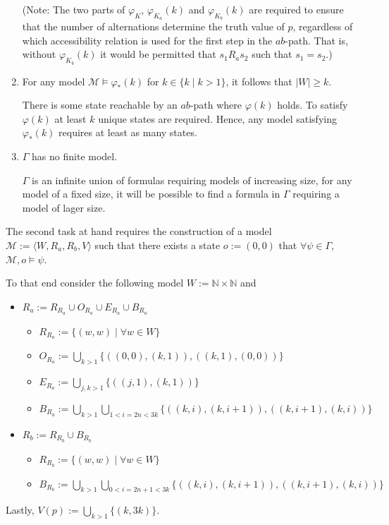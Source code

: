 \documentclass[11pt,a4paper]{article}
\begin{document}
\begin{enumerate}
(Note: The two parts of $\varphi_K$, $\varphi_{K_a}(k)$ and $ \varphi_{K_b}(k)$ are required to ensure that the number of alternations determine the truth value of $p$, regardless of which accessibility relation is used for the first step in the $ab$-path. That is, without $ \varphi_{K_b}(k)$ it would be permitted that $s_1R_as_2$ such that $s_1=s_2$.) 

\item For any model $\mathcal{M} \models \varphi_*(k)$ for $k \in \{k \mid k>1\}$, it follows that $|W|\geq k$.

There is some state reachable by an $ab$-path where $\varphi(k)$ holds. To satisfy $\varphi(k)$ at least $k$ unique states are required. Hence, any model satisfying $\varphi_*(k)$ requires at least as many states. 

\item $\Gamma$ has no finite model.


 $\Gamma$ is an infinite union of formulas requiring models of increasing size, for any model of a fixed size, it will be possible to find a formula in $\Gamma$ requiring a model of lager size. 
\end{enumerate}


The second task at hand requires the construction of a model $\mathcal{M}:= \langle W, R_a, R_b, V\rangle$ such that there exists a state $o:=(0,0)$ that $\forall \psi \in \Gamma$, $\mathcal{M}, o \models \psi$.

To that end consider the following model $W:= \mathbb{N}\times \mathbb{N}$ and 
\begin{itemize}
\item $R_a := R_{R_a} \cup O_{R_a} \cup E_{R_a} \cup B_{R_a}$
\begin{itemize}
\item $R_{R_a} := \{(w,w) \mid \forall w \in W\}$
\item $O_{R_a} :=  \bigcup_{k > 1} \{((0,0),(k,1)), ((k,1),(0,0))\} $
\item $E_{R_a} := \bigcup_{j,k > 1} \{((j,1),(k,1))\}$
\item $B_{R_a} :=   \bigcup_{k > 1} \bigcup_{ 1 < i=2n < 3k} \{((k,i),(k,i+1)),((k,i+1),(k,i))\}$
\end{itemize}
\item $R_b :=  R_{R_b} \cup B_{R_b}$
\begin{itemize}
\item $R_{R_b} := \{(w,w) \mid \forall w \in W\}$
\item $B_{R_b} := \bigcup_{k > 1} \bigcup_{ 0 < i=2n+1 < 3k} \{((k,i),(k,i+1)),((k,i+1),(k,i))\}$
\end{itemize}

\end{itemize}
Lastly, $V(p):= \bigcup_{k > 1} \{ (k,3k)\}$.
\end{document}

